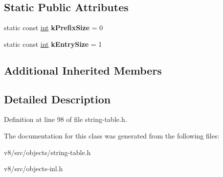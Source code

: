 \subsection*{Static Public Attributes}
\begin{DoxyCompactItemize}
\item 
\mbox{\label{classv8_1_1internal_1_1StringSetShape_a9f882960b586821f9be85ca0db2c0815}} 
static const \mbox{\hyperlink{classint}{int}} {\bfseries k\+Prefix\+Size} = 0
\item 
\mbox{\label{classv8_1_1internal_1_1StringSetShape_a4a427230d66644be41457f3aec74bec7}} 
static const \mbox{\hyperlink{classint}{int}} {\bfseries k\+Entry\+Size} = 1
\end{DoxyCompactItemize}
\subsection*{Additional Inherited Members}


\subsection{Detailed Description}


Definition at line 98 of file string-\/table.\+h.



The documentation for this class was generated from the following files\+:\begin{DoxyCompactItemize}
\item 
v8/src/objects/string-\/table.\+h\item 
v8/src/objects-\/inl.\+h\end{DoxyCompactItemize}
